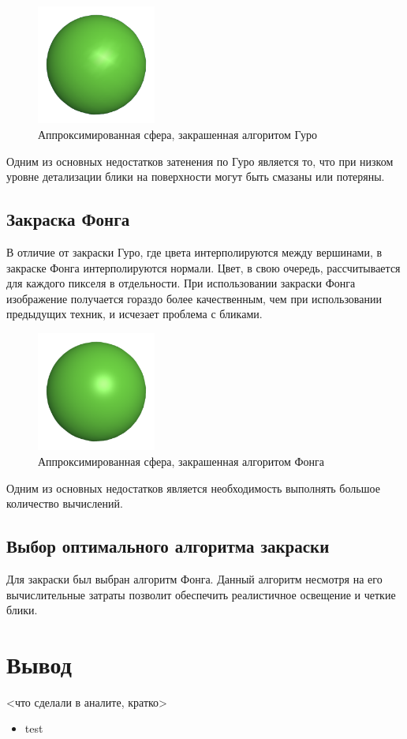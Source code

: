 \begin{figure}[h] 
	\centering
	\includegraphics[width=0.35\textwidth]{images/gurou-shading.png}
	\caption{Аппроксимированная сфера, закрашенная алгоритом Гуро} 
	\label{fig:gurou-shading} 
\end{figure}

Одним из основных недостатков затенения по Гуро является то, что при низком уровне детализации блики на поверхности могут быть смазаны или потеряны.

\subsection{Закраска Фонга}

В отличие от закраски Гуро, где цвета интерполируются между вершинами, в закраске Фонга интерполируются нормали. Цвет, в свою очередь, рассчитывается для каждого пикселя в отдельности. При использовании закраски Фонга изображение получается гораздо более качественным, чем при использовании предыдущих техник, и исчезает проблема с бликами.

\begin{figure}[h] 
	\centering
	\includegraphics[width=0.35\textwidth]{images/phong-shading.png}
	\caption{Аппроксимированная сфера, закрашенная алгоритом Фонга} 
	\label{fig:phong-shading} 
\end{figure}

Одним из основных недостатков является необходимость выполнять большое количество вычислений.

\subsection{Выбор оптимального алгоритма закраски}

Для закраски был выбран алгоритм Фонга. Данный алгоритм несмотря на его вычислительные затраты позволит обеспечить реалистичное освещение и четкие блики.

\section*{Вывод}

<что сделали в аналите, кратко>

\begin{itemize}
	\item test
\end{itemize}

\clearpage
